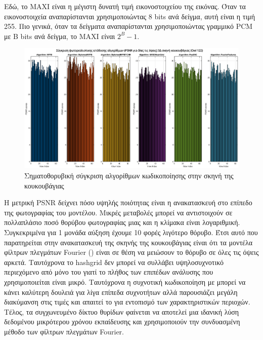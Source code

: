     Εδώ, το MAXI είναι η μέγιστη δυνατή τιμή εικονοστοιχείου της εικόνας. Όταν τα εικονοστοιχεία αναπαρίστανται χρησιμοποιώντας 8 bits ανά δείγμα, αυτή είναι η τιμή 255. Πιο γενικά, όταν τα δείγματα αναπαρίστανται χρησιμοποιώντας γραμμικό PCM με B bits ανά δείγμα, το MAXI είναι $2^{B} - 1$.
\begin{figure}[H]
\centering
      \begin{adjustbox}{width=1\linewidth}
        \includegraphics{images/chapter5_img/EvalMetricsPlots/Multiview-MultiAlgorithm-PSNRComparison.eps} %
      \end{adjustbox}
    \caption{Σηματοθορυβική σύγκριση αλγορίθμων κωδικοποίησης στην σκηνή της κουκουβάγιας}
    \label{fig:psnrcomparison}
\end{figure}
\par
    Η μετρική PSNR δείχνει πόσο υψηλής ποιότητας είναι η  ανακατασκευή στο επίπεδο της φωτογραφίας του μοντέλου. Μικρές μεταβολές μπορεί να αντιστοιχούν σε πολλαπλάσιο ποσό θορύβου φωτογραφίας μιας και η κλίμακα είναι λογαριθμική. Συγκεκριμένα για 1 μονάδα αύξηση έχουμε 10 φορές λιγότερο θόρυβο. Έτσι αυτό που παρατηρείται στην ανακατασκευή της σκηνής της κουκουβάγιας είναι ότι τα μοντέλα φίλτρων πλεγμάτων Fourier () είναι σε θέση να μειώσουν το θόρυβο σε όλες τις όψεις αρκετά. Ταυτόχρονα το hashgrid δεν μπορεί να συλλάβει υψηλοσυχνοτικό περιεχόμενο από μόνο του γιατί το πλήθος των επιπέδων ανάλυσης που χρησιμοποιείται είναι μικρό. Ταυτόχρονα η συχνοτική κωδικοποίηση με μπορεί να κάνει καλύτερη δουλειά για λίγα επίπεδα συχνοτήτων αλλά παρουσιάζει μεγάλη διακύμανση στις τιμές και απαιτεί το  για εντοπισμό των χαρακτηριστικών περιοχών. Τέλος, τα συγχωνευμένο δίκτυο θυρίδων  φαίνεται να αποτελεί μια ιδανική λύση δεδομένου μικρότερου χρόνου εκπαίδευσης και χρησιμοποιούν την συνδυασμένη μέθοδο των φίλτρων πλεγμάτων Fourier.
